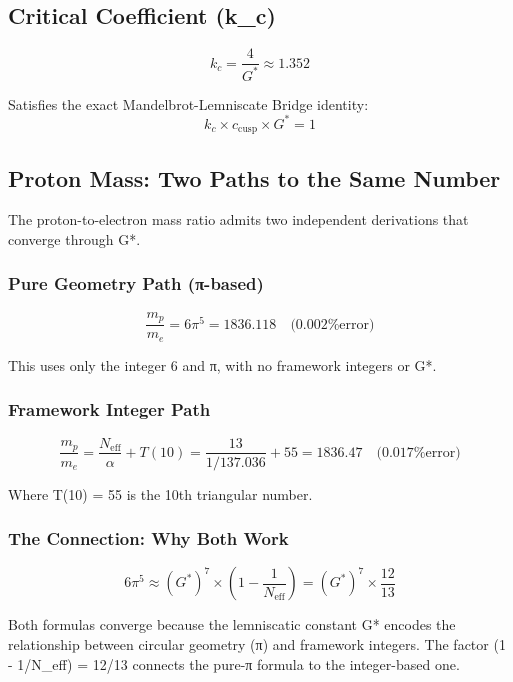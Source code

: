 \documentclass[
  11pt,
  letterpaper,
  twoside,
  openright]{book}
\begin{document}
\subsection{Critical Coefficient (k\_c)}\label{critical-coefficient-k_c}

\[
k_c = \frac{4}{G^*} \approx 1.352
\]

Satisfies the exact Mandelbrot-Lemniscate Bridge identity:
\[k_c \times c_{\text{cusp}} \times G^* = 1\]

\subsection{Proton Mass: Two Paths to the Same
Number}\label{proton-mass-two-paths-to-the-same-number}

The proton-to-electron mass ratio admits two independent derivations
that converge through G*.

\subsubsection{Pure Geometry Path
(π-based)}\label{pure-geometry-path-ux3c0-based}

\[
\frac{m_p}{m_e} = 6\pi^5 = 1836.118 \quad \text{(0.002\% error)}
\]

This uses only the integer 6 and π, with no framework integers or G*.

\subsubsection{Framework Integer Path}\label{framework-integer-path}

\[
\frac{m_p}{m_e} = \frac{N_{\text{eff}}}{\alpha} + T(10) = \frac{13}{1/137.036} + 55 = 1836.47 \quad \text{(0.017\% error)}
\]

Where T(10) = 55 is the 10th triangular number.

\subsubsection{The Connection: Why Both
Work}\label{the-connection-why-both-work}

\[
6\pi^5 \approx (G^*)^7 \times \left(1 - \frac{1}{N_{\text{eff}}}\right) = (G^*)^7 \times \frac{12}{13}
\]

Both formulas converge because the lemniscatic constant G* encodes the
relationship between circular geometry (π) and framework integers. The
factor (1 - 1/N\_eff) = 12/13 connects the pure-π formula to the
integer-based one.
\end{document}
